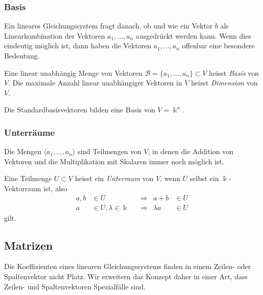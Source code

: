 \subsubsection{Basis}
Ein lineares Gleichungssystem fragt danach, ob und wie ein Vektor $b$ als
Linearkombination der Vektoren $a_1,\dots,a_n$ ausgedrückt werden kann.
Wenn dies eindeutig möglich ist, dann haben die Vektoren $a_1,\dots,a_n$
offenbar eine besondere Bedeutung.

\begin{definition}
%
%
Eine linear unabhängig Menge von Vektoren
$\mathcal{B}=\{a_1,\dots,a_n\}\subset V$
heisst {\em Basis} von $V$.
Die maximale Anzahl linear unabhängiger Vektoren in $V$ heisst 
{\em Dimension} von $V$.
\end{definition}

Die Standardbasisvektoren bilden eine Basis von $V=\Bbbk^n$.

\subsubsection{Unterräume}
Die Mengen $\langle a_1,\dots,a_n\rangle$ sind Teilmengen
von $V$, in denen die Addition von Vektoren und die Multiplikation mit 
Skalaren immer noch möglich ist.

\begin{definition}
Eine Teilmenge $U\subset V$ heisst ein {\em Unterraum} von $V$, wenn
$U$ selbst ein $\Bbbk$-Vektorraum ist, also
\[
\begin{aligned}
a,b&\in U &&\Rightarrow &a+b&\in U
\\
a&\in U, \lambda\in\Bbbk &&\Rightarrow & \lambda a&\in U
\end{aligned}
\]
gilt.
\end{definition}

%
%
\subsection{Matrizen
\label{buch:grundlagen:subsection:matrizen}}
Die Koeffizienten eines linearen Gleichungssystems finden in einem 
Zeilen- oder Spaltenvektor nicht Platz.
Wir erweitern das Konzept daher in einer Art, dass Zeilen- und
Spaltenvektoren Spezialfälle sind.

